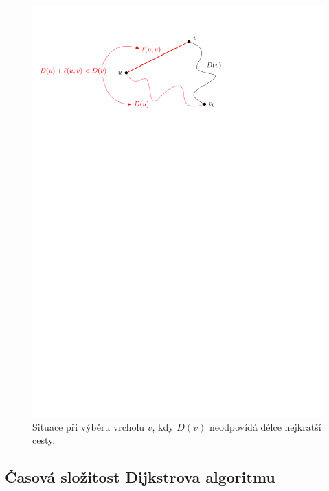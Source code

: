 \begin{figure}[h]
    \centering
    \includegraphics[scale=\graphimgsize]{01-grafalgo/images/ch01_dijkstra_vyber_vrcholu.pdf}
    \caption{Situace při výběru vrcholu $v$, kdy $D(v)$ neodpovídá délce nejkratší cesty.}
    \label{fig:dijkstra_vyber_vrcholu}
\end{figure}

\subsection{Časová složitost Dijkstrova algoritmu}

